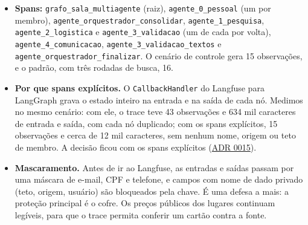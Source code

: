 \documentclass[12pt,a4paper]{article}
\begin{document}
\begin{itemize}
\item \textbf{Spans:} \texttt{grafo\_\allowbreak{}sala\_\allowbreak{}multiagente} (raiz), \texttt{agente\_\allowbreak{}0\_\allowbreak{}pessoal} (um por membro), \texttt{agente\_\allowbreak{}orquestrador\_\allowbreak{}consolidar}, \texttt{agente\_\allowbreak{}1\_\allowbreak{}pesquisa}, \texttt{agente\_\allowbreak{}2\_\allowbreak{}logistica} e \texttt{agente\_\allowbreak{}3\_\allowbreak{}validacao} (um de cada por volta), \texttt{agente\_\allowbreak{}4\_\allowbreak{}comunicacao}, \texttt{agente\_\allowbreak{}3\_\allowbreak{}validacao\_\allowbreak{}textos} e \texttt{agente\_\allowbreak{}orquestrador\_\allowbreak{}finalizar}. O cenário de controle gera 15 observações, e o padrão, com três rodadas de busca, 16.
\item \textbf{Por que spans explícitos.} O \texttt{CallbackHandler} do Langfuse para LangGraph grava o estado inteiro na entrada e na saída de cada nó. Medimos no mesmo cenário: com ele, o trace teve 43 observações e 634 mil caracteres de entrada e saída, com cada nó duplicado; com os spans explícitos, 15 observações e cerca de 12 mil caracteres, sem nenhum nome, origem ou teto de membro. A decisão ficou com os spans explícitos (\href{https://github.com/Residencia-IA-Challenge-2-Grupo-7/residencia-ia-g7-challenge2/blob/main/docs/decisoes/0015-orquestracao-com-langgraph.md}{ADR 0015}).
\item \textbf{Mascaramento.} Antes de ir ao Langfuse, as entradas e saídas passam por uma máscara de e-mail, CPF e telefone, e campos com nome de dado privado (teto, origem, usuário) são bloqueados pela chave. É uma defesa a mais: a proteção principal é o cofre. Os preços públicos dos lugares continuam legíveis, para que o trace permita conferir um cartão contra a fonte.
\end{itemize}
\end{document}
